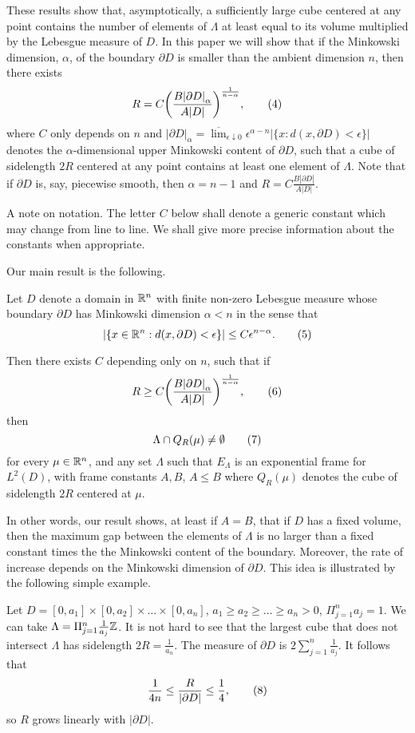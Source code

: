 These results show that, asymptotically, a sufficiently large cube centered
at any point contains the number of elements of $\Lambda$ at least equal 
to its volume multiplied by the Lebesgue measure of $D$. In this paper we 
will show that if the Minkowski dimension, $\alpha$,  of the boundary 
$\partial D$ is smaller than the ambient dimension $n$, then there exists 
$$R=C{\left(\frac{{B|\partial D|}_{\alpha}}{A|D|}\right)}^{\frac{1}{n-\alpha}},
\tag4$$ where $C$ only depends on $n$ and
${|\partial D|}_{\alpha}=\overline{\lim}_{\epsilon \downarrow 0} 
{\epsilon}^{\alpha-n} |\{x: d(x, \partial D)<\epsilon\}|$ denotes the 
$\alpha$-dimensional upper Minkowski content of $\partial D$, 
such that a cube of sidelength $2R$ centered at any point contains at least
one element of $\Lambda$. Note that if $\partial D$ is, say, piecewise smooth,
then $\alpha=n-1$ and $R=C\frac{B|\partial D|}{A|D|}$. 

A note on notation. The letter $C$ below shall denote a generic constant 
which may change from line to line. We shall give more precise information
about the constants when appropriate. 

Our main result is the following. 

 Let $D$ denote a domain in ${\Bbb R}^n$ with finite 
non-zero Lebesgue measure whose boundary $\partial D$ has Minkowski dimension 
$\alpha<n$ in the sense that 
$$ |\{x \in {\Bbb R}^n: d(x, \partial D)< \epsilon\}| \leq 
C {\epsilon}^{n-\alpha}. \tag5$$

Then there exists $C$ depending only on $n$, such that if 
$$ R \ge C 
{\left(\frac{{B|\partial D|}_{\alpha}}{A|D|}\right)}^{\frac{1}{n-\alpha}},
\tag6$$ then  
$$ \Lambda \cap Q_R(\mu) \not= \emptyset \tag7$$ for every  
$\mu \in {\Bbb R}^n$, and any set $\Lambda$ such that $E_{\Lambda}$ is an 
exponential frame for $L^2(D)$, with frame constants $A,B$, $A\leq B$ 
where $Q_R(\mu)$ denotes the cube of sidelength $2R$ centered at $\mu$. 
\endproclaim 

In other words, our result shows, at least if $A=B$, 
that if $D$ has a fixed volume, then the 
maximum gap between the elements of $\Lambda$ is no larger than a fixed
constant times the the Minkowski content of the boundary. Moreover, 
the rate of increase depends on the Minkowski dimension of $\partial D$. 
This idea is illustrated by the following simple example. 

 Let $D=[0,a_1] \times [0,a_2] \times \dots \times 
[0,a_n]$, $a_1 \ge a_2 \ge \dots \ge a_n>0$, $\Pi_{j=1}^n a_j=1$. 
We can take $\Lambda=\Pi_{j=1}^n 
\frac{1}{a_j} {\Bbb Z}$. It is not hard to see that the largest cube that
does not intersect $\Lambda$ has sidelength $2R=\frac{1}{a_n}$. The measure
of $\partial D$ is $2\sum_{j=1}^n \frac{1}{a_j}$. It follows that 
$$ \frac{1}{4n} \leq \frac{R}{|\partial D|} \leq \frac{1}{4}, \tag8$$ 
so $R$ grows linearly with $|\partial D|$. 
\endproclaim 

